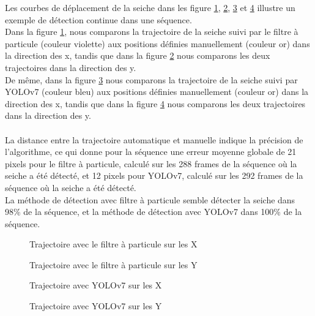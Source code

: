 Les courbes de déplacement de la seiche dans les figure \ref{fig:trajX_pf}, \ref{fig:trajY_pf}, \ref{fig:trajX_yolo} et \ref{fig:trajY_yolo} illustre un exemple de détection continue dans une séquence.\\
Dans la figure \ref{fig:trajX_pf}, nous comparons la trajectoire de la seiche suivi par le filtre à particule (couleur violette) aux positions définies manuellement (couleur or) dans la direction des x, tandis que dans la figure \ref{fig:trajY_pf} nous comparons les deux trajectoires dans la direction des y.\\
De même, dans la figure \ref{fig:trajX_yolo} nous comparons la trajectoire de la seiche suivi par YOLOv7 (couleur bleu) aux positions définies manuellement (couleur or) dans la direction des x, tandis que dans la figure \ref{fig:trajY_yolo} nous comparons les deux trajectoires dans la direction des y.\\
\\
La distance entre la trajectoire automatique et manuelle indique la précision de l'algorithme, ce qui donne pour la séquence une erreur moyenne globale de 21 pixels pour le filtre à particule, calculé sur les 288 frames de la séquence où la seiche a été détecté, et 12 pixels pour YOLOv7, calculé sur les 292 frames de la séquence où la seiche a été détecté.\\
La méthode de détection avec filtre à particule semble détecter la seiche dans 98\% de la séquence, et la méthode de détection avec YOLOv7 dans 100\% de la séquence.

\begin{figure}[!htbp]
\center
\caption{Trajectoire avec le filtre à particule sur les X}
\label{fig:trajX_pf}
\end{figure}
\FloatBarrier

\begin{figure}[!htbp]
\center
\caption{Trajectoire avec le filtre à particule sur les Y}
\label{fig:trajY_pf}
\end{figure}
\FloatBarrier

\begin{figure}[!htbp]
\center
\caption{Trajectoire avec YOLOv7 sur les X}
\label{fig:trajX_yolo}
\end{figure}
\FloatBarrier

\begin{figure}[!htbp]
\center
\caption{Trajectoire avec YOLOv7 sur les Y}
\label{fig:trajY_yolo}
\end{figure}
\FloatBarrier
 
